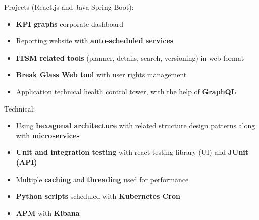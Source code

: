 \documentclass[10pt,a4paper,ragged2e,withhyper]{altacv}
\begin{document}


\makecvheader


\vspace{-.5\baselineskip}
\begin{minipage}[t]{0.45\textwidth}
  \vspace{0pt}
Projects (React.js and Java Spring Boot):
  \begin{itemize}
  \item \textbf{KPI graphs} corporate dashboard
  \item Reporting website with \textbf{auto-scheduled services}
  \item \textbf{ITSM related tools} (planner, details, search, versioning) in web format
  \item \textbf{Break Glass Web tool} with user rights management
  \item Application technical health control tower, with the help of \textbf{GraphQL}
\end{itemize}
\end{minipage}
\hfill
\begin{minipage}[t]{0.45\textwidth}
  \vspace{0pt}
  Technical:
  \begin{itemize}
    \item Using \textbf{hexagonal architecture} with related structure design patterns along with \textbf{microservices}
    \item \textbf{Unit and integration testing} with react-testing-library (UI) and \textbf{JUnit (API)}
    \item Multiple \textbf{caching} and \textbf{threading} used for performance
    \item \textbf{Python scripts} scheduled with \textbf{Kubernetes Cron}
    \item \textbf{APM} with \textbf{Kibana}
  \end{itemize}
\end{minipage}
\end{document}
